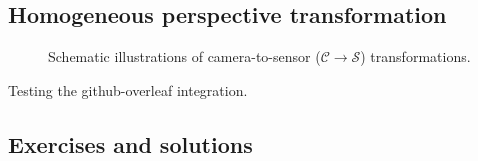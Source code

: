 \documentclass[draft]{CVCN}
\begin{document}
\subsection{Homogeneous perspective transformation}

\begin{figure}
    \centering
    
    \caption{Schematic illustrations of camera-to-sensor (\(\mathcal{C}\rightarrow\mathcal{S}\)) transformations.}%
    \label{fig:homocoords-perspectivetransform}
\end{figure}

Testing the github-overleaf integration.


\subsection{Exercises and solutions}

\printsolutions\
\end{document}
